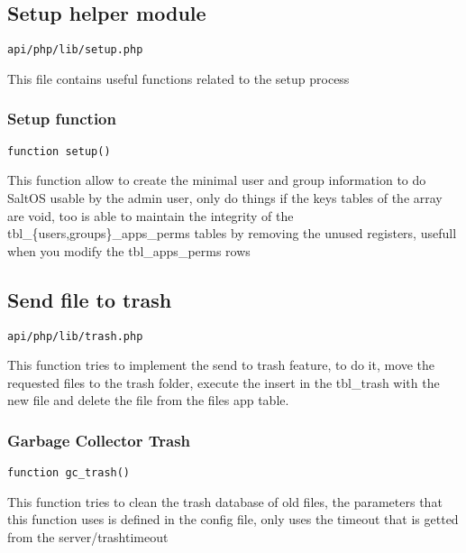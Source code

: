 \documentclass[a4paper]{article}
\begin{document}
\hypertarget{toc527}{}
\subsection{Setup helper module}

\begin{lstlisting}
api/php/lib/setup.php
\end{lstlisting}

This file contains useful functions related to the setup process

\hypertarget{toc528}{}
\subsubsection{Setup function}

\begin{lstlisting}
function setup()
\end{lstlisting}

This function allow to create the minimal user and group information to do SaltOS
usable by the admin user, only do things if the keys tables of the array are void,
too is able to maintain the integrity of the tbl\_\{users,groups\}\_apps\_perms tables
by removing the unused registers, usefull when you modify the tbl\_apps\_perms rows

\hypertarget{toc529}{}
\subsection{Send file to trash}

\begin{lstlisting}
api/php/lib/trash.php
\end{lstlisting}

This function tries to implement the send to trash feature, to do it, move the
requested files to the trash folder, execute the insert in the tbl\_trash with
the new file and delete the file from the files app table.

\hypertarget{toc530}{}
\subsubsection{Garbage Collector Trash}

\begin{lstlisting}
function gc_trash()
\end{lstlisting}

This function tries to clean the trash database of old files, the parameters
that this function uses is defined in the config file, only uses the timeout
that is getted from the server/trashtimeout
\end{document}
